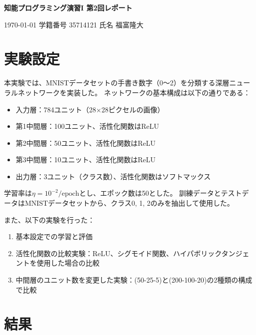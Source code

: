 \documentclass{article}
\begin{document}

\begin{center} 
{\large \bf 知能プログラミング演習I 第2回レポート}
\end{center} %

\begin{flushright} 
\today %
\hskip 1mm
学籍番号 35714121 %
\hskip 1mm
氏名 福富隆大%
\end{flushright} %

\section{実験設定}
本実験では、MNISTデータセットの手書き数字（0〜2）を分類する深層ニューラルネットワークを実装した。
ネットワークの基本構成は以下の通りである：

\begin{itemize}
  \item 入力層：784ユニット（28×28ピクセルの画像）
  \item 第1中間層：100ユニット、活性化関数はReLU
  \item 第2中間層：50ユニット、活性化関数はReLU
  \item 第3中間層：10ユニット、活性化関数はReLU
  \item 出力層：3ユニット（クラス数）、活性化関数はソフトマックス
\end{itemize}

学習率は$\eta = 10^{-2}/\text{epoch}$とし、エポック数は50とした。
訓練データとテストデータはMNISTデータセットから、クラス0, 1, 2のみを抽出して使用した。

また、以下の実験を行った：
\begin{enumerate}
  \item 基本設定での学習と評価
  \item 活性化関数の比較実験：ReLU、シグモイド関数、ハイパボリックタンジェントを使用した場合の比較
  \item 中間層のユニット数を変更した実験：(50-25-5)と(200-100-20)の2種類の構成で比較
\end{enumerate}


\section{結果}
\end{document}
